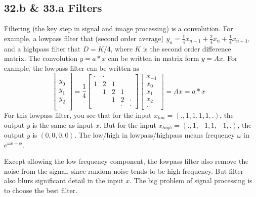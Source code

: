 \documentclass{article}
\begin{document}
\begin{spacing}{1.5}
\section*{32.b \& 33.a Filters}
Filtering (the key step in signal and image processing) is a convolution. For example, a lowpass filter that (second order average) $y_n=\frac{1}{4}x_{n-1} + \frac{2}{4}x_n + \frac{1}{4}x_{n+1}$, and a highpass filter that $D=K/4$, where $K$ is the second order difference matrix. The convolution $y = a * x$ can be written in matrix form $y=Ax$. For example, the lowpass filter can be written as 
$$
\begin{bmatrix}
\cdot \\
y_0 \\
y_1 \\
y_2 \\
\cdot
\end{bmatrix}
=
\frac{1}{4}
\begin{bmatrix}
\cdot & \cdot \\
1 & 2 & 1 \\
 & 1 & 2 & 1 \\
 &   & 1 & 2 & \cdot \\
 &   &   & \cdot & \cdot 
\end{bmatrix}
\begin{bmatrix}
x_{-1} \\
x_0 \\
x_1 \\
x_2 \\
\cdot
\end{bmatrix}
= Ax 
= a* x
$$
For this lowpass filter, you see that for the input $x_{low}=(., 1, 1, 1, 1, .)$, the output $y$ is the same as input $x$. But for the input $x_{high}=(., 1, -1, 1, -1, .)$, the output $y$ is $(0, 0, 0, 0)$. The low/high in lowpass/highpass means  frequency $\omega$ in $e^{\omega x + \phi}$.

Except allowing the low frequency component, the lowpass filter also remove the noise from the signal, since random noise tends to be high frequency. But filter also blurs significant detail in the input $x$. The big problem of signal processing is to choose the best filter.


\end{spacing}
\end{document}
